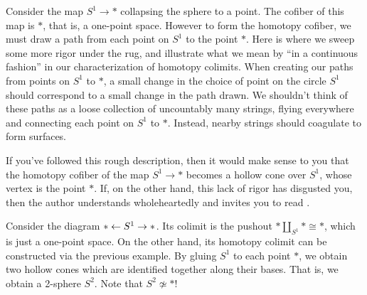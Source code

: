 \begin{example} Consider the map $S^1 \to \ast$ collapsing the sphere to a point. The cofiber of this map is $\ast$, that is, a one-point space. However to form the homotopy cofiber, we must draw a path from each point on $S^1$ to the point $\ast$. Here is where we sweep some more rigor under the rug, and illustrate what we mean by ``in a continuous fashion'' in our characterization of homotopy colimits. When creating our paths from points on $S^1$ to $\ast$, a small change in the choice of point on the circle $S^1$ should correspond to a small change in the path drawn. We shouldn't think of these paths as a loose collection of uncountably many strings, flying everywhere and connecting each point on $S^1$ to $\ast$. Instead, nearby strings should coagulate to form surfaces.

\begin{figure}[H]
  \centering
\end{figure}

If you've followed this rough description, then it would make sense to you that the homotopy cofiber of the map $S^1 \to \ast$ becomes a hollow cone over $S^1$, whose vertex is the point $\ast$. If, on the other hand, this lack of rigor has disgusted you, then the author understands wholeheartedly and invites you to read \cite{Dugger}.
\end{example}



\begin{example} Consider the diagram $\ast \leftarrow S^1 \to \ast$. Its colimit is the pushout $\ast \amalg_{S^1} \ast \cong \ast$, which is just a one-point space. On the other hand, its homotopy colimit can be constructed via the previous example. By gluing $S^1$ to each point $\ast$, we obtain two hollow cones which are identified together along their bases. That is, we obtain a 2-sphere $S^2$. Note that $S^2 \not \simeq \ast$!
\end{example}

